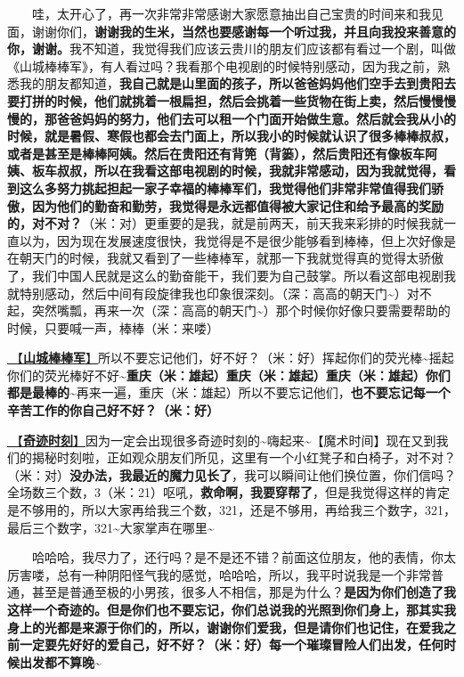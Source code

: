 \documentclass[]{ctexbook}
\begin{document}
  哇，太开心了，再一次非常非常感谢大家愿意抽出自己宝贵的时间来和我见面，谢谢你们，\textbf{谢谢我的生米，当然也要感谢每一个听过我，并且向我投来善意的你，谢谢。}我不知道，我觉得我们应该云贵川的朋友们应该都有看过一个剧，叫做《山城棒棒军》，有人看过吗？我看那个电视剧的时候特别感动，因为我之前，熟悉我的朋友都知道，\textbf{我自己就是山里面的孩子，所以爸爸妈妈他们空手去到贵阳去要打拼的时候，他们就挑着一根扁担，然后会挑着一些货物在街上卖，然后慢慢慢慢的，那爸爸妈妈的努力，他们去可以租一个门面开始做生意。然后就会我从小的时候，就是暑假、寒假也都会去门面上，所以我小的时候就认识了很多棒棒叔叔，或者是甚至是棒棒阿姨。然后在贵阳还有背篼（背篓），然后贵阳还有像板车阿姨、板车叔叔，所以在我看这部电视剧的时候，我就非常感动，因为我就觉得，看到这么多努力挑起担起一家子幸福的棒棒军们，我觉得他们非常非常值得我们骄傲，因为他们的勤奋和勤劳，我觉得是永远都值得被大家记住和给予最高的奖励的，对不对？}（米：对）更重要的是我，就是前两天，前天我来彩排的时候我就一直以为，因为现在发展速度很快，我觉得是不是很少能够看到棒棒，但上次好像是在朝天门的时候，我就又看到了一些棒棒军，就那一下我就觉得真的觉得太骄傲了，我们中国人民就是这么的勤奋能干，我们要为自己鼓掌。所以看这部电视剧我就特别感动，然后中间有段旋律我也印象很深刻。（深：高高的朝天门\textasciitilde）对不起，突然嘴瓢，再来一次（深：高高的朝天门\textasciitilde）那个时候你好像只要需要帮助的时候，只要喊一声，棒棒（米：来喽）

\hyperref[nice-chongqing]{🎵【\textbf{山城棒棒军}】}所以不要忘记他们，好不好？（米：好）挥起你们的荧光棒\textasciitilde 摇起你们的荧光棒好不好\textasciitilde{}\textbf{重庆（米：雄起）重庆（米：雄起）重庆（米：雄起）你们都是最棒的\textasciitilde{}}再来一遍，重庆（米：雄起）所以不要忘记他们，\textbf{也不要忘记每一个辛苦工作的你自己好不好？（米：好）}

\hyperref[magic-moment]{🎵【\textbf{奇迹时刻}】}因为一定会出现很多奇迹时刻的\textasciitilde 嗨起来\textasciitilde【魔术时间】现在又到我们的揭秘时刻啦，正如观众朋友们所见，这里有一个小红凳子和白椅子，对不对？（米：对）\textbf{没办法，我最近的魔力见长了}，我可以瞬间让他们换位置，你们信吗？全场数三个数，3（米：21）呕吼，\textbf{救命啊，我要穿帮了}，但是我觉得这样的肯定是不够用的，所以大家再给我三个数，321，还是不够用，再给我三个数字，321，最后三个数字，321\textasciitilde 大家掌声在哪里\textasciitilde{}

  哈哈哈，我尽力了，还行吗？是不是还不错？前面这位朋友，他的表情，你太厉害喽，总有一种阴阳怪气我的感觉，哈哈哈，所以，我平时说我是一个非常普通，甚至是普通至极的小男孩，很多人不相信，那是为什么？\textbf{是因为你们创造了我这样一个奇迹的。但是你们也不要忘记，你们总说我的光照到你们身上，那其实我身上的光都是来源于你们的，所以，谢谢你们爱我，但是请你们也记住，在爱我之前一定要先好好的爱自己，好不好？（米：好）每一个璀璨冒险人们出发，任何时候出发都不算晚\textasciitilde{}}
\end{document}
